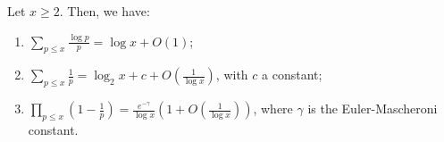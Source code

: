 \begin{theorem}\label{thm:Mertens}
    Let $x \geq 2$. Then, we have:
    \leavevmode
    \begin{enumerate}[label={\upshape\roman*)}]
        \item\label{thm:Mertens:i} $\displaystyle\sum_{p \leq x} \frac{\log p }{p}=\log x +  O(1)$;
        \item\label{thm:Mertens:ii} $\displaystyle\sum_{p\leq x} \frac{1}{p} = \log_2 x + c + O \left(\frac{1}{\log x}\right)$, with $c$ a constant;
        \item\label{thm:Mertens:iii} $\displaystyle \prod_{p\leq x} \left(1-\frac{1}{p}\right) = \frac{e^{-\gamma}}{\log x}\left(1+O\left(\frac{1}{\log x}\right)\right)$, where $\gamma$ is the Euler-Mascheroni constant.
    \end{enumerate}
\end{theorem}
